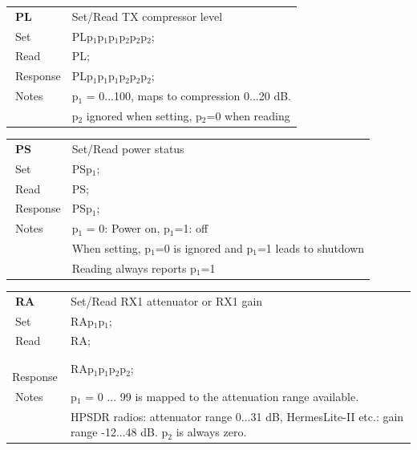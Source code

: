 \documentclass[12pt]{book}
\begin{document}
\begin{center}
\begin{tabular}{|p{2cm}|p{11cm}|}
\toprule
$\phantom{\Big|}$\textbf{\large PL} & Set/Read TX compressor level \\\cline{1-2}
$\phantom{\Big|}${\large Set} & {PLp$_1$p$_1$p$_1$p$_2$p$_2$p$_2$;} \\\hline
$\phantom{\Big|}${\large Read} & {PL;} \\\hline
$\phantom{\Big|}${\large Response} & {PLp$_1$p$_1$p$_1$p$_2$p$_2$p$_2$;} \\\hline
$\phantom{\Big|}${\large Notes} & \multicolumn{1}{|p{11cm}|}{p$_1$ = 0...100, maps to compression 0...20 dB.} \\
 & \multicolumn{1}{|p{11cm}|}{p$_2$ ignored when setting, p$_2$=0 when reading} \\
\bottomrule
\end{tabular}
\end{center}

\begin{center}
\begin{tabular}{|p{2cm}|p{11cm}|}
\toprule
$\phantom{\Big|}$\textbf{\large PS} & Set/Read power status \\\cline{1-2}
$\phantom{\Big|}${\large Set} & {PSp$_1$;} \\\hline
$\phantom{\Big|}${\large Read} & {PS;} \\\hline
$\phantom{\Big|}${\large Response} & {PSp$_1$;} \\\hline
$\phantom{\Big|}${\large Notes} & \multicolumn{1}{|p{11cm}|}{p$_1$ = 0: Power on, p$_1$=1: off} \\
 & \multicolumn{1}{|p{11cm}|}{When setting, p$_1$=0 is ignored and p$_1$=1 leads to shutdown} \\
 & \multicolumn{1}{|p{11cm}|}{Reading always reports p$_1$=1} \\
\bottomrule
\end{tabular}
\end{center}

\begin{center}
\begin{tabular}{|p{2cm}|p{11cm}|}
\toprule
$\phantom{\Big|}$\textbf{\large RA} & Set/Read RX1 attenuator or RX1 gain \\\cline{1-2}
$\phantom{\Big|}${\large Set} & {RAp$_1$p$_1$;} \\\hline
$\phantom{\Big|}${\large Read} & {RA;} \\\hline
$\phantom{\Big|}${\large Response} & {RAp$_1$p$_1$p$_2$p$_2$;} \\\hline
$\phantom{\Big|}${\large Notes} & \multicolumn{1}{|p{11cm}|}{p$_1$ = 0 ... 99 is mapped to the attenuation range available.} \\
 & \multicolumn{1}{|p{11cm}|}{HPSDR radios: attenuator range 0...31 dB, HermesLite-II etc.: gain range -12...48 dB. p$_2$ is always zero.} \\
\bottomrule
\end{tabular}
\end{center}
\end{document}
